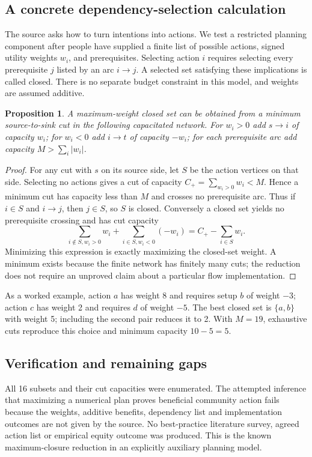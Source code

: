 \documentclass[11pt]{article}
\newtheorem{proposition}{Proposition}
\begin{document}
\subsection{A concrete dependency-selection calculation}
The source asks how to turn intentions into actions. We test a restricted planning component after people have supplied a finite list of possible actions, signed utility weights $w_i$, and prerequisites. Selecting action $i$ requires selecting every prerequisite $j$ listed by an arc $i\to j$. A selected set satisfying these implications is called closed. There is no separate budget constraint in this model, and weights are assumed additive.
\begin{proposition}
A maximum-weight closed set can be obtained from a minimum source-to-sink cut in the following capacitated network. For $w_i>0$ add $s\to i$ of capacity $w_i$; for $w_i<0$ add $i\to t$ of capacity $-w_i$; for each prerequisite arc add capacity $M>\sum_i|w_i|$.
\end{proposition}
\begin{proof}
For any cut with $s$ on its source side, let $S$ be the action vertices on that side. Selecting no actions gives a cut of capacity $C_+=\sum_{w_i>0}w_i<M$. Hence a minimum cut has capacity less than $M$ and crosses no prerequisite arc. Thus if $i\in S$ and $i\to j$, then $j\in S$, so $S$ is closed. Conversely a closed set yields no prerequisite crossing and has cut capacity
\[
\sum_{i\notin S,w_i>0}w_i+\sum_{i\in S,w_i<0}(-w_i)
=C_+-\sum_{i\in S}w_i.
\]
Minimizing this expression is exactly maximizing the closed-set weight. A minimum exists because the finite network has finitely many cuts; the reduction does not require an unproved claim about a particular flow implementation.
\end{proof}
As a worked example, action $a$ has weight 8 and requires setup $b$ of weight $-3$; action $c$ has weight 2 and requires $d$ of weight $-5$. The best closed set is $\{a,b\}$ with weight 5; including the second pair reduces it to 2. With $M=19$, exhaustive cuts reproduce this choice and minimum capacity $10-5=5$.
\subsection{Verification and remaining gaps}
All 16 subsets and their cut capacities were enumerated. The attempted inference that maximizing a numerical plan proves beneficial community action fails because the weights, additive benefits, dependency list and implementation outcomes are not given by the source. No best-practice literature survey, agreed action list or empirical equity outcome was produced. This is the known maximum-closure reduction in an explicitly auxiliary planning model.
\end{document}
